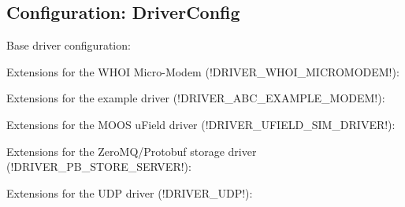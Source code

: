 \subsection{Configuration: DriverConfig}

Base driver configuration:

\resetbvlinenumber

Extensions for the WHOI Micro-Modem (!DRIVER_WHOI_MICROMODEM!):
\resetbvlinenumber

Extensions for the example driver (!DRIVER_ABC_EXAMPLE_MODEM!):
\resetbvlinenumber

Extensions for the MOOS uField driver (!DRIVER_UFIELD_SIM_DRIVER!):
\resetbvlinenumber

Extensions for the ZeroMQ/Protobuf storage driver (!DRIVER_PB_STORE_SERVER!):
\resetbvlinenumber

Extensions for the UDP driver (!DRIVER_UDP!):
\resetbvlinenumber


\DeleteShortVerb{\!}
